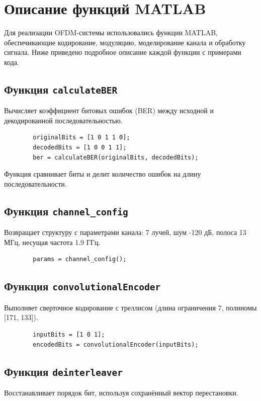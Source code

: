 \documentclass[a4paper,14pt,oneside,openany]{memoir}
\begin{document}
	\section{Описание функций MATLAB}
	
	Для реализации OFDM-системы использовались функции MATLAB, обеспечивающие кодирование, модуляцию, моделирование канала и обработку сигнала. Ниже приведено подробное описание каждой функции с примерами кода.
	
	\subsection{Функция \texttt{calculateBER}}
	Вычисляет коэффициент битовых ошибок (BER) между исходной и декодированной последовательностью.
	
	\begin{lstlisting}
		originalBits = [1 0 1 1 0];
		decodedBits = [1 0 0 1 1];
		ber = calculateBER(originalBits, decodedBits);
	\end{lstlisting}
	
	Функция сравнивает биты и делит количество ошибок на длину последовательности.
	
	\subsection{Функция \texttt{channel\_config}}
	Возвращает структуру с параметрами канала: 7 лучей, шум -120 дБ, полоса 13 МГц, несущая частота 1.9 ГГц.
	
	\begin{lstlisting}
		params = channel_config();
	\end{lstlisting}
	
	\subsection{Функция \texttt{convolutionalEncoder}}
	Выполняет сверточное кодирование с треллисом (длина ограничения 7, полиномы [171, 133]).
	
	\begin{lstlisting}
		inputBits = [1 0 1];
		encodedBits = convolutionalEncoder(inputBits);
	\end{lstlisting}
	
	\subsection{Функция \texttt{deinterleaver}}
	Восстанавливает порядок бит, используя сохранённый вектор перестановки.
	
\end{document}
